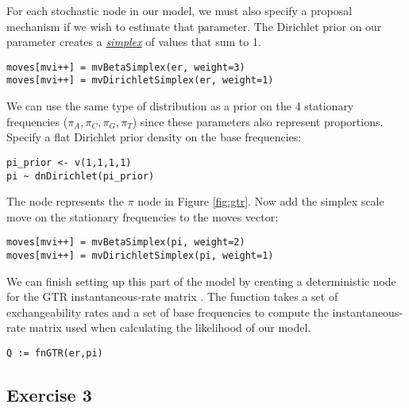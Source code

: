 For each stochastic node in our model, we must also specify a proposal mechanism if we wish to estimate that parameter. 
The Dirichlet prior on our parameter  creates a \href{http://en.wikipedia.org/wiki/Simplex}{\textit{simplex}} of values that sum to 1. 

{\tt\small \begin{snugshade*}
\begin{lstlisting}
moves[mvi++] = mvBetaSimplex(er, weight=3)
moves[mvi++] = mvDirichletSimplex(er, weight=1)
\end{lstlisting}
\end{snugshade*}}

We can use the same type of distribution as a prior on the 4 stationary frequencies ($\pi_A, \pi_C, \pi_G, \pi_T$) since these parameters also represent proportions. 
Specify a flat Dirichlet prior density on the base frequencies:
{\tt \begin{snugshade*}
\begin{lstlisting}
pi_prior <- v(1,1,1,1) 
pi ~ dnDirichlet(pi_prior)
\end{lstlisting}
\end{snugshade*}}

The node  represents the $\pi$ node in Figure \ref{fig:gtr}.
Now add the simplex scale move on the stationary frequencies to the moves vector:
{\tt \small \begin{snugshade*}
\begin{lstlisting}
moves[mvi++] = mvBetaSimplex(pi, weight=2)
moves[mvi++] = mvDirichletSimplex(pi, weight=1)
\end{lstlisting}
\end{snugshade*}}

We can finish setting up this part of the model by creating a deterministic node for the GTR instantaneous-rate matrix . 
The  function takes a set of exchangeability rates and a set of base frequencies to compute the instantaneous-rate matrix used when calculating the likelihood of our model.
{\tt \begin{snugshade*}
\begin{lstlisting}
Q := fnGTR(er,pi)
\end{lstlisting}
\end{snugshade*}}




\subsection{Exercise 3}

